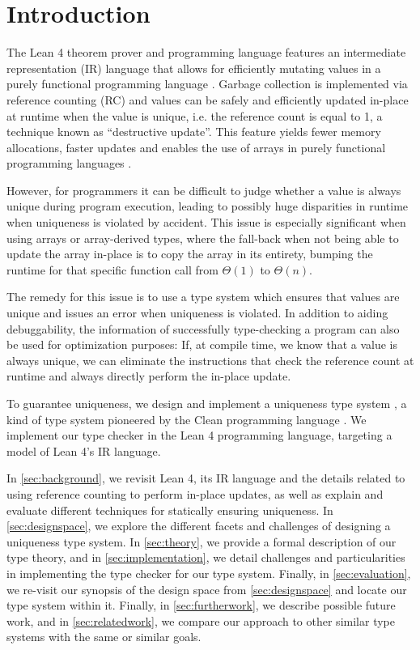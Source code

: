 \chapter{Introduction}\label{sec:intro}

The Lean 4 theorem prover and programming language \citep{moura_lean_2021} features an intermediate representation (IR) language that allows for efficiently mutating values in a purely functional programming language \citep{ullrich_counting_2020}. Garbage collection is implemented via reference counting (RC) and values can be safely and efficiently updated in-place at runtime when the value is unique, i.e. the reference count is equal to 1, a technique known as ``destructive update''. This feature yields fewer memory allocations, faster updates and enables the use of arrays in purely functional programming languages \citep{ullrich_counting_2020}.

However, for programmers it can be difficult to judge whether a value is always unique during program execution, leading to possibly huge disparities in runtime when uniqueness is violated by accident. This issue is especially significant when using arrays or array-derived types, where the fall-back when not being able to update the array in-place is to copy the array in its entirety, bumping the runtime for that specific function call from $\Theta(1)$ to $\Theta(n)$.

The remedy for this issue is to use a type system which ensures that values are unique and issues an error when uniqueness is violated. In addition to aiding debuggability, the information of successfully type-checking a program can also be used for optimization purposes: If, at compile time, we know that a value is always unique, we can eliminate the instructions that check the reference count at runtime and always directly perform the in-place update.

To guarantee uniqueness, we design and implement a uniqueness type system \citep{sergey_linearity_2022}, a kind of type system pioneered by the Clean programming language \citep{smetsers_guaranteeing_1994}. We implement our type checker in the Lean 4 programming language, targeting a model of Lean 4's IR language.

In \cref{sec:background}, we revisit Lean 4, its IR language and the details related to using reference counting to perform in-place updates, as well as explain and evaluate different techniques for statically ensuring uniqueness. In \cref{sec:designspace}, we explore the different facets and challenges of designing a uniqueness type system. In \cref{sec:theory}, we provide a formal description of our type theory, and in \cref{sec:implementation}, we detail challenges and particularities in implementing the type checker for our type system. Finally, in \cref{sec:evaluation}, we re-visit our synopsis of the design space from \cref{sec:designspace} and locate our type system within it. Finally, in \cref{sec:furtherwork}, we describe possible future work, and in \cref{sec:relatedwork}, we compare our approach to other similar type systems with the same or similar goals.